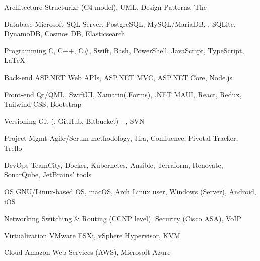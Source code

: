 

\begin{cvskills}

  \cvskill
    {Architecture}
    {Structurizr (C4 model), UML, Design Patterns, The }

  \cvskill
    {Database}
    {Microsoft SQL Server, PostgreSQL, MySQL/MariaDB, , SQLite, DynamoDB, Cosmos DB, Elasticsearch}

  \cvskill
    {Programming}
    {C, C++, C\#, Swift, Bash, PowerShell, JavaScript, TypeScript, \LaTeX}

  \cvskill
    {Back-end}
    {ASP.NET Web APIs, ASP.NET MVC, ASP.NET Core, Node.js}

  \cvskill
    {Front-end}
    {Qt/QML, SwiftUI, Xamarin(.Forms), .NET MAUI, React, Redux, Tailwind CSS, Bootstrap}

  \cvskill
    {Versioning}
    {Git (, GitHub, Bitbucket) - , SVN}

  \cvskill
    {Project Mgmt}
    {Agile/Scrum methodology, Jira, Confluence, Pivotal Tracker, Trello}

  \cvskill
    {DevOps}
    {TeamCity, Docker, Kubernetes, Ansible, Terraform, Renovate, SonarQube, JetBrains' tools}

  \cvskill
    {OS}
    {GNU/Linux-based OS, macOS, Arch Linux user, Windows (Server), Android, iOS}

  \cvskill
    {Networking}
    {Switching \& Routing (CCNP level), Security (Cisco ASA), VoIP}

  \cvskill
    {Virtualization}
    {VMware ESXi, vSphere Hypervisor, KVM}

  \cvskill
    {Cloud}
    {Amazon Web Services (AWS), Microsoft Azure}

\end{cvskills}

